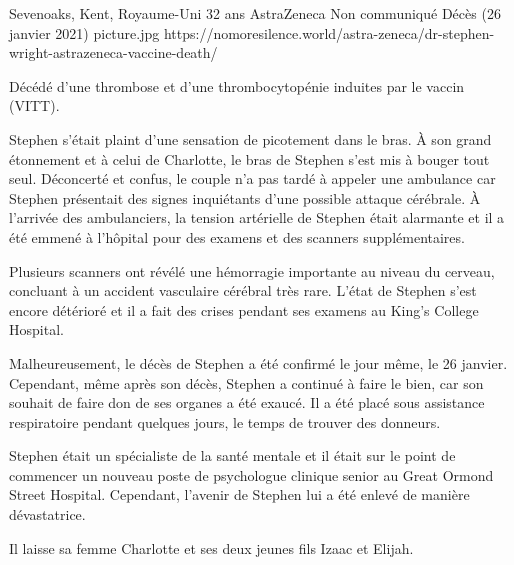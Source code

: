 {Sevenoaks, Kent, Royaume-Uni}
{32 ans}
{AstraZeneca}
{Non communiqué}
{Décès (26 janvier 2021)}
{picture.jpg}
{https://nomoresilence.world/astra-zeneca/dr-stephen-wright-astrazeneca-vaccine-death/}
{

Décédé d'une thrombose et d'une thrombocytopénie induites par le vaccin (VITT).

Stephen s'était plaint d'une sensation de picotement dans le bras. À son grand
étonnement et à celui de Charlotte, le bras de Stephen s'est mis à bouger tout
seul. Déconcerté et confus, le couple n'a pas tardé à appeler une ambulance car
Stephen présentait des signes inquiétants d'une possible attaque cérébrale. À
l'arrivée des ambulanciers, la tension artérielle de Stephen était alarmante et
il a été emmené à l'hôpital pour des examens et des scanners supplémentaires.

Plusieurs scanners ont révélé une hémorragie importante au niveau du cerveau,
concluant à un accident vasculaire cérébral très rare. L'état de Stephen s'est
encore détérioré et il a fait des crises pendant ses examens au King's College
Hospital.

Malheureusement, le décès de Stephen a été confirmé le jour même, le 26
janvier. Cependant, même après son décès, Stephen a continué à faire le bien,
car son souhait de faire don de ses organes a été exaucé. Il a été placé sous
assistance respiratoire pendant quelques jours, le temps de trouver des
donneurs.

Stephen était un spécialiste de la santé mentale et il était sur le point de
commencer un nouveau poste de psychologue clinique senior au Great Ormond Street
Hospital. Cependant, l'avenir de Stephen lui a été enlevé de manière
dévastatrice.

Il laisse sa femme Charlotte et ses deux jeunes fils Izaac et Elijah.

}
